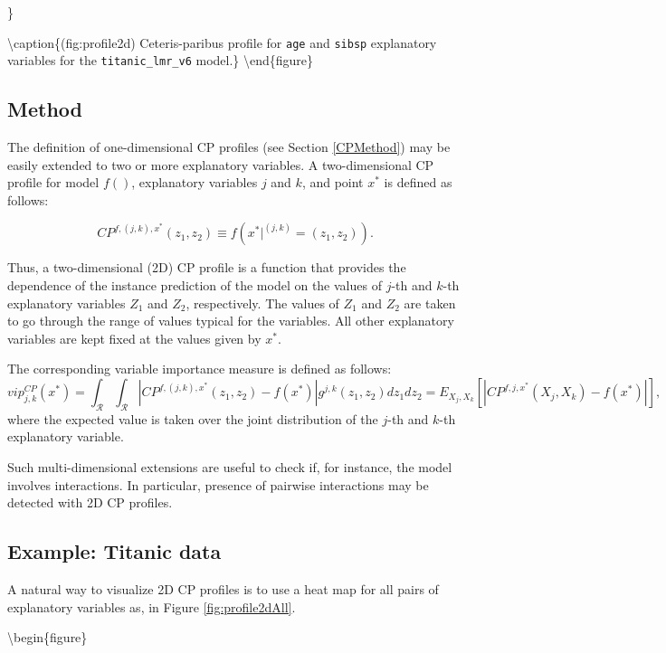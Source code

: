 \documentclass[12pt,]{krantz}
\begin{document}
\}

\textbackslash{}caption\{(fig:profile2d) Ceteris-paribus profile for \texttt{age} and \texttt{sibsp} explanatory variables for the \texttt{titanic\_lmr\_v6} model.\}\label{fig:profile2d}
\textbackslash{}end\{figure\}

\hypertarget{ceterisParibus2dMethod}{%
\subsection{Method}\label{ceterisParibus2dMethod}}

The definition of one-dimensional CP profiles (see Section \ref{CPMethod}) may be easily extended to two or more explanatory variables. A two-dimensional CP profile for model \(f()\), explanatory variables \(j\) and \(k\), and point \(x^*\) is defined as follows:

\[
CP^{f, (j,k), x^*}(z_1, z_2) \equiv f(x^*|^{(j,k)} = (z_1,z_2)).
\]

Thus, a two-dimensional (2D) CP profile is a function that provides the dependence of the instance prediction of the model on the values of \(j\)-th and \(k\)-th explanatory variables \(Z_1\) and \(Z_2\), respectively. The values of \(Z_1\) and \(Z_2\) are taken to go through the range of values typical for the variables. All other explanatory variables are kept fixed at the values given by \(x^*\).

The corresponding variable importance measure is defined as follows:
\[
vip^{CP}_{j,k}(x^*) = \int_{\mathcal R}\int_{\mathcal R} |CP^{f,(j,k),x^*}(z_1,z_2) - f(x^*)| g^{j,k}(z_1,z_2)dz_1dz_2=E_{X_j,X_k}[|CP^{f,j,x^*}(X_j,X_k) - f(x^*)|],
\]
where the expected value is taken over the joint distribution of the \(j\)-th and \(k\)-th explanatory variable.

Such multi-dimensional extensions are useful to check if, for instance, the model involves interactions. In particular, presence of pairwise interactions may be detected with 2D CP profiles.

\hypertarget{ceterisParibus2dExample}{%
\subsection{Example: Titanic data}\label{ceterisParibus2dExample}}

A natural way to visualize 2D CP profiles is to use a heat map for all pairs of explanatory variables as, in Figure \ref{fig:profile2dAll}.

\textbackslash{}begin\{figure\}
\end{document}
